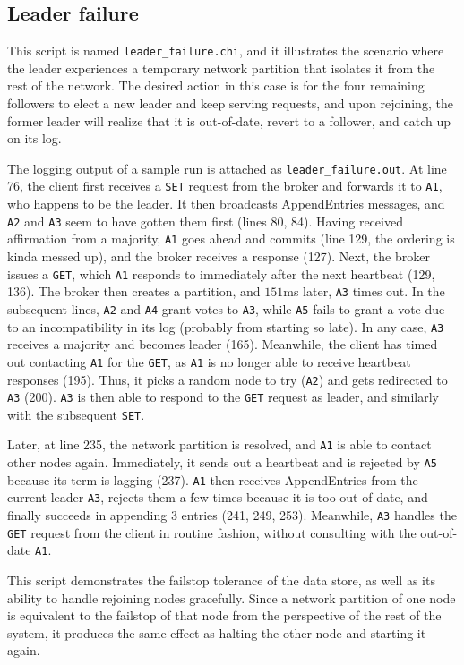 \documentclass[psamsfonts]{amsart}
\begin{document}
\subsection{Leader failure}
This script is named \verb|leader_failure.chi|, and it illustrates the scenario where the leader experiences a temporary network partition that isolates it from the rest of the network. The desired action in this case is for the four remaining followers to elect a new leader and keep serving requests, and upon rejoining, the former leader will realize that it is out-of-date, revert to a follower, and catch up on its log.

The logging output of a sample run is attached as \verb|leader_failure.out|. At line 76, the client first receives a \verb|SET| request from the broker and forwards it to \verb|A1|, who happens to be the leader. It then broadcasts AppendEntries messages, and \verb|A2| and \verb|A3| seem to have gotten them first (lines 80, 84). Having received affirmation from a majority, \verb|A1| goes ahead and commits (line 129, the ordering is kinda messed up), and the broker receives a response (127). Next, the broker issues a \verb|GET|, which \verb|A1| responds to immediately after the next heartbeat (129, 136). The broker then creates a partition, and $151$ms later, \verb|A3| times out. In the subsequent lines, \verb|A2| and \verb|A4| grant votes to \verb|A3|, while \verb|A5| fails to grant a vote due to an incompatibility in its log (probably from starting so late). In any case, \verb|A3| receives a majority and becomes leader (165). Meanwhile, the client has timed out contacting \verb|A1| for the \verb|GET|, as \verb|A1| is no longer able to receive heartbeat responses (195). Thus, it picks a random node to try (\verb|A2|) and gets redirected to \verb|A3| (200). \verb|A3| is then able to respond to the \verb|GET| request as leader, and similarly with the subsequent \verb|SET|. 

Later, at line 235, the network partition is resolved, and \verb|A1| is able to contact other nodes again. Immediately, it sends out a heartbeat and is rejected by \verb|A5| because its term is lagging (237). \verb|A1| then receives AppendEntries from the current leader \verb|A3|, rejects them a few times because it is too out-of-date, and finally succeeds in appending 3 entries (241, 249, 253). Meanwhile, \verb|A3| handles the \verb|GET| request from the client in routine fashion, without consulting with the out-of-date \verb|A1|.

This script demonstrates the failstop tolerance of the data store, as well as its ability to handle rejoining nodes gracefully. Since a network partition of one node is equivalent to the failstop of that node from the perspective of the rest of the system, it produces the same effect as halting the other node and starting it again.
\end{document}

